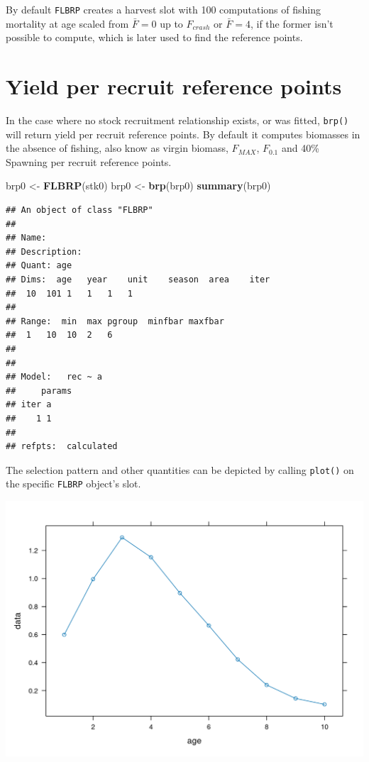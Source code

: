 \documentclass[
]{book}
\newenvironment{Shaded}{\begin{snugshade}}{\end{snugshade}}
\newcommand{\FunctionTok}[1]{\textcolor[rgb]{0.13,0.29,0.53}{\textbf{#1}}}
\newcommand{\NormalTok}[1]{#1}
\newcommand{\OtherTok}[1]{\textcolor[rgb]{0.56,0.35,0.01}{#1}}
\begin{document}
By default \texttt{FLBRP} creates a harvest slot with 100 computations of fishing mortality at age scaled from \(\bar{F}=0\) up to \(F_{crash}\) or \(\bar{F}=4\), if the former isn't possible to compute, which is later used to find the reference points.

\hypertarget{yield-per-recruit-reference-points}{%
\section{Yield per recruit reference points}\label{yield-per-recruit-reference-points}}

In the case where no stock recruitment relationship exists, or was fitted, \texttt{brp()} will return yield per recruit reference points. By default it computes biomasses in the absence of fishing, also know as virgin biomass, \(F_{MAX}\), \(F_{0.1}\) and 40\% Spawning per recruit reference points.

\begin{Shaded}
\begin{Highlighting}[]
\NormalTok{brp0 }\OtherTok{\textless{}{-}} \FunctionTok{FLBRP}\NormalTok{(stk0)}
\NormalTok{brp0 }\OtherTok{\textless{}{-}} \FunctionTok{brp}\NormalTok{(brp0)}
\FunctionTok{summary}\NormalTok{(brp0)}
\end{Highlighting}
\end{Shaded}

\begin{verbatim}
## An object of class "FLBRP"
## 
## Name:  
## Description:  
## Quant: age 
## Dims:  age   year    unit    season  area    iter
##  10  101 1   1   1   1   
## 
## Range:  min  max pgroup  minfbar maxfbar 
##  1   10  10  2   6   
## 
## 
## Model:   rec ~ a
##     params
## iter a
##    1 1
## 
## refpts:  calculated
\end{verbatim}

The selection pattern and other quantities can be depicted by calling \texttt{plot()} on the specific \texttt{FLBRP} object's slot.

\includegraphics{_bookdown_files/_main_files/figure-html/selection pattern-1.png}
\end{document}
